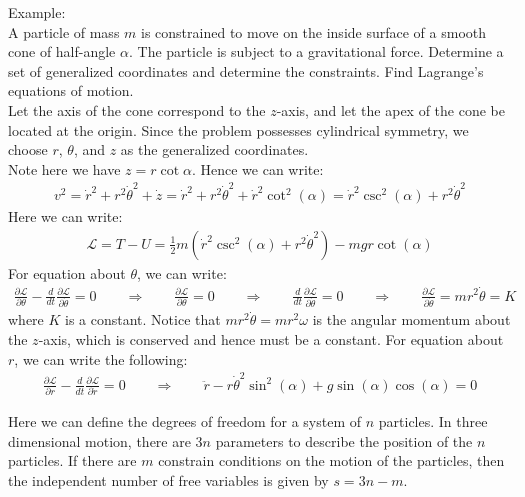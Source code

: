 \documentclass[11pt,oneside]{book}
\theoremstyle{break}
\theoremstyle{break}
\newcommand{\pd}{\partial}
\newcommand{\example}{\color{green}Example: \color{black}}
\begin{document}
\hfill\break
\hfill\break
\example\\
A particle of mass $m$ is constrained to move on the inside surface of a smooth cone of half-angle $\alpha$. The particle is subject to a gravitational force. Determine a set of generalized coordinates and determine the constraints. Find Lagrange's equations of motion.\\

Let the axis of the cone correspond to the $z$-axis, and let the apex of the cone be located at the origin. Since the problem possesses cylindrical symmetry, we choose $r$, $\theta$, and $z$ as the generalized coordinates. \\

Note here we have $z = r\cot \alpha$. Hence we can write:
\begin{align*}
v^2 = \dot{r}^2 + r^2 \dot{\theta}^2 + \dot{z} =\dot{r}^2 + r^2 \dot{\theta}^2 + \dot{r}^2 \cot^2 (\alpha) = \dot{r}^2 \csc^2 (\alpha) +  r^2 \dot{\theta}^2 
\end{align*}
Here we can write:
\begin{align*}
\mathcal{L} = T-U =  \frac{1}{2}m (\dot{r}^2 \csc^2 (\alpha) +  r^2 \dot{\theta}^2 ) - mgr \cot(\alpha)
\end{align*}
For equation about $\theta$, we can write:
\begin{align*}
\frac{\pd \mathcal{L}}{\pd \theta} - \frac{d}{dt}\frac{\pd \mathcal{L}}{\pd \dot{\theta}} = 0 \qquad \Rightarrow \qquad \frac{\pd \mathcal{L}}{\pd \theta} = 0 \qquad\Rightarrow \qquad  \frac{d}{dt}\frac{\pd \mathcal{L}}{\pd \dot{\theta}} = 0\qquad\Rightarrow\qquad \frac{\pd \mathcal{L}}{\pd \dot{\theta}} = mr^2 \dot{\theta} = K
\end{align*}
where $K$ is a constant. Notice that $mr^2\dot{\theta} = mr^2 \omega$ is the angular momentum about the $z$-axis, which is conserved and hence must be a constant. For equation about $r$, we can write the following:
\begin{align*}
\frac{\pd \mathcal{L}}{\pd r} - \frac{d}{dt} \frac{\pd \mathcal{L}}{\pd \dot{r}} = 0 \qquad \Rightarrow \qquad \ddot{r} - r\dot{\theta}^2\sin^2(\alpha) + g\sin(\alpha) \cos(\alpha) = 0
\end{align*}
\hfill\break
\hfill\break
\hfill\break

Here we can define the degrees of freedom for a system of $n$ particles. In three dimensional motion, there are $3n$ parameters to describe the position of the $n$ particles. If there are $m$ constrain conditions on the motion of the particles, then the independent number of free variables is given by $s = 3n - m$. 
\end{document}

